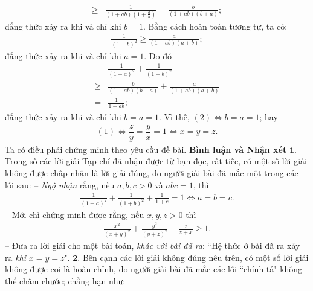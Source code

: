 \begin{multicols}{2}
\begin{align*}
		\ge &\frac{1}{{\left( {1 + ab} \right)\left( {1 + \frac{a}{b}} \right)}}= \frac{b}{{\left( {1 + ab} \right)\left( {b + a} \right)}};
	\end{align*}
	đẳng thức xảy ra khi và chỉ khi $b = 1$.
	\vskip 0.05cm
	Bằng cách hoàn toàn tương tự, ta có:
	\begin{align*}
		\frac{1}{{{{\left( {1 + b} \right)}^2}}} \ge \frac{a}{{\left( {1 + ab} \right)\left( {a + b} \right)}};
	\end{align*}
	đẳng thức xảy ra khi và chỉ khi $a = 1$.
	\vskip 0.05cm
	Do đó
	\begin{align*}
		&\frac{1}{{{{\left( {1 + a} \right)}^2}}} + \frac{1}{{{{\left( {1 + b} \right)}^2}}} \\[-0.4ex]
		\ge &\frac{b}{{\left( {1 + ab} \right)\left( {b + a} \right)}} + \frac{a}{{\left( {1 + ab} \right)\left( {a + b} \right)}} \\[-0.4ex]
		= &\frac{1}{{1 + ab}};
	\end{align*}
	đẳng thức xảy ra khi và chỉ khi $b = a = 1$.
	\vskip 0.05cm
	Vì thế, $(2) \Leftrightarrow b = a = 1$; hay
	\begin{align*}
		(1)  \Leftrightarrow  \dfrac{z}{y} = \dfrac{y}{x} = 1  \Leftrightarrow  x = y = z.
	\end{align*}
	Ta có điều phải chứng minh theo yêu cầu đề bài.
	\vskip 0.05cm
	\textbf{\color{thachthuctoanhoc}Bình luận và Nhận xét}
	\vskip 0.05cm
	$\pmb{1.}$ Trong số các lời giải Tạp chí đã nhận được từ bạn đọc, rất tiếc, có một số lời giải không được chấp nhận là lời giải đúng, do người giải bài đã mắc một trong các lỗi sau:
	\vskip 0.05cm
	-- \textit{Ngộ nhận} rằng, nếu $a, b, c > 0$ và $abc = 1$, thì
	\begin{align*}
		\frac{1}{{{{\left( {1 \!+\! a} \right)}^2}}} \!+\! \frac{1}{{{{\left( {1 \!+\! b} \right)}^2}}} \!+\! \frac{1}{{1 \!+\! c}} \!=\! 1 \!\Leftrightarrow\! a \!=\!b \!=\!c.
	\end{align*}
	-- Mới chỉ chứng minh được rằng, nếu $x, y, z > 0$ thì
	\begin{align*}
		\frac{{{x^2}}}{{{{\left( {x + y} \right)}^2}}} + \frac{{{y^2}}}{{{{\left( {y + z} \right)}^2}}} + \frac{z}{{z + x}} \ge 1.
	\end{align*}
	-- Đưa ra lời giải cho một bài toán, \textit{khác với bài đã ra}: ``Hệ thức ở bài đã ra xảy ra \textit{khi} $x = y = z$".
	\vskip 0.05cm
	$\pmb{2.}$ Bên cạnh các lời giải không đúng nêu trên, có một số lời giải không được coi là hoàn chỉnh, do người giải bài đã mắc các lỗi ``chính tả" không thể châm chước; chẳng hạn như:

\end{multicols}
